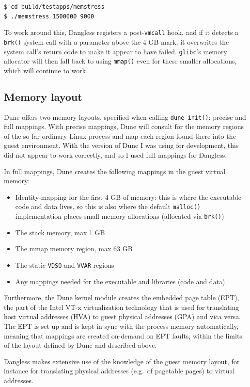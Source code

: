 \begin{verbatim}
$ cd build/testapps/memstress
$ ./memstress 1500000 9000
\end{verbatim}

To work around this, Dangless registers a post-\lstinline!vmcall! hook, and if it detects a \lstinline!brk()! system call with a parameter above the 4 GB mark, it overwrites the system call's return code to make it appear to have failed. \texttt{glibc}'s memory allocator will then fall back to using \lstinline!mmap()! even for these smaller allocations, which will continue to work.

\subsection{Memory layout}

Dune offers two memory layouts, specified when calling \lstinline!dune_init()!: precise and full mappings.
With precise mappings, Dune will consult  for the memory regions of the so-far ordinary Linux process and map each region found there into the guest environment. With the version of Dune I was using for development, this did not appear to work correctly, and so I used full mappings for Dangless.

In full mappings, Dune creates the following mappings in the guest virtual memory:

\begin{itemize}
	\item Identity-mapping for the first 4 GB of memory: this is where the executable code and data lives, so this is also where the default \lstinline!malloc()! implementation places small memory allocations (allocated via \lstinline!brk()!)
	\item The stack memory, max 1 GB
	\item The mmap memory region, max 63 GB
	\item The static \texttt{VDSO} and \texttt{VVAR} regions
	\item Any mappings needed for the executable and libraries (code and data)
\end{itemize}

Furthermore, the Dune kernel module creates the embedded page table (EPT), the part of the Intel VT-x virtualization technology that is used for translating host virtual addresses (HVA) to guest physical addresses (GPA) and vica versa. The EPT is set up and is kept in sync with the process memory automatically, meaning that mappings are created on-demand on EPT faults, within the limits of the layout defined by Dune and described above.

Dangless makes extensive use of the knowledge of the guest memory layout, for instance for translating physical addresses (e.g.\ of pagetable pages) to virtual addresses.

